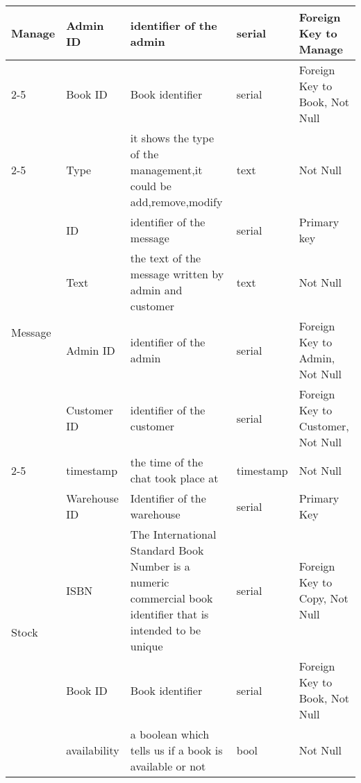 \begin{longtable}{|p{}|p{} |p{}|p{}|p{} |}
\multirow{4}{*}{Manage} & Admin ID &identifier of the admin &serial & Foreign Key to Manage\\\cline{2-5}
& Book ID & Book identifier & serial  & Foreign Key to Book, Not Null \\\cline{2-5}
& Type &it shows the type of the management,it could be add,remove,modify &text & Not Null\\\hline

\multirow{4}{*}{Message} 
& ID &identifier of the message &serial & Primary key\\\cline{2-5}
& Text &the text of the message written by admin and customer & text & Not Null\\\cline{2-5}
& Admin ID &identifier of the admin &serial & Foreign Key to Admin, Not Null\\\cline{2-5}
& Customer
ID & identifier of the customer &serial & Foreign Key to Customer, Not Null\\\cline{2-5}
& timestamp & the time of the chat took place at & timestamp & Not Null  \\\hline

\multirow{4}{*}{Stock} & Warehouse ID &Identifier of the warehouse &serial &  Primary Key\\\cline{2-5}
& ISBN & The International Standard Book Number is a numeric commercial book identifier that is intended to be unique & serial & Foreign Key to Copy, Not Null\\\cline{2-5}
& Book ID & Book identifier & serial  & Foreign Key to Book, Not Null\\\cline{2-5}
& availability & a boolean which tells us if a book is available or not & bool & Not Null\\\hline
\end{longtable}